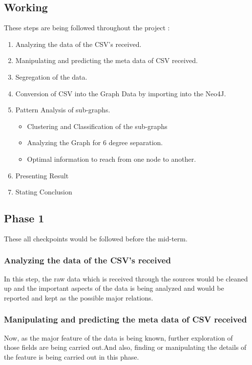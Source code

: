 \subsection{Working}
These steps are being followed throughout the project : 
\begin{enumerate}
    \item Analyzing the data of the CSV's received.
    \item Manipulating and predicting the meta data of CSV received.
    \item Segregation of the data.
    \item Conversion of CSV into the Graph Data by importing into the Neo4J.
    \item Pattern Analysis of sub-graphs.
    \begin{itemize}
        \item Clustering and Classification of the sub-graphs
        \item Analyzing the Graph for 6 degree separation.
        \item Optimal information to reach from one node to another.
    \end{itemize}
    \item Presenting Result
    \item Stating Conclusion
    
\end{enumerate}

\subsection{Phase 1}
These all checkpoints would be followed before the mid-term.

\subsubsection{Analyzing the data of the CSV’s received}

In this step, the raw data which is received through the sources would be cleaned up and the important aspects of the data is being analyzed and would be reported and kept as the possible major relations.

\subsubsection{Manipulating and predicting the meta data of CSV received}

Now, as the major feature of the data is being known, further exploration of those fields are being carried out.And also, finding or manipulating the details of the feature is being carried out in this phase.

